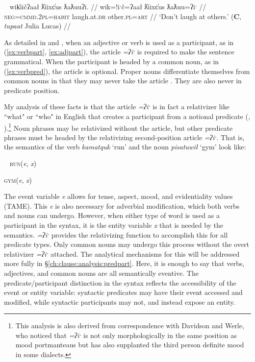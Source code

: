 \ex~ \label{ex:adjpart}
\begingl
\glpreamble wik̓iičʔaał ƛ̓iixc̓us ƛaƛuuʔi. //
\gla wik=!iˑč=ʔaał ƛ̓iixc̓us ƛaƛuu=ʔiˑ //
\glb \textsc{neg}=\textsc{cmmd.2pl}=\textsc{habit} laugh.at.\textsc{dr} other.\textsc{pl}=\textsc{art} //
\glft `Don't laugh at others.' (\textbf{C}, \textit{tupaat} Julia Lucas) //
\endgl
\xe


As detailed in \citet{jacobsen1979} and \citet{wojdak2001}, when an adjective or verb is used as a participant, as in (\ref{ex:verbpart}, \ref{ex:adjpart}), the article \textit{=ʔiˑ} is required to make the sentence grammatical. When the participant is headed by a common noun, as in (\ref{ex:verbpred}), the article is optional. Proper nouns differentiate themselves from common nouns in that they may never take the article \citep{inman2018}. They are also never in predicate position.

My analysis of these facts is that the article \textit{=ʔiˑ} is in fact a relativizer like ``what" or ``who" in English that creates a participant from a notional predicate (\citet[p.~136]{davidson2002}, \citet{inman2018}).\footnote{This analysis is also derived from correspondence with Davidson and Werle, who noticed that \textit{=ʔiˑ} is not only morphologically in the same position as mood portmanteaus but has also supplanted the third person definite mood in some dialects.} Noun phrases may be relativized without the article, but other predicate phrases must be headed by the relativizing second-position article \textit{=ʔiˑ}. That is, the semantics of the verb \textit{kamatquk} `run' and the noun \textit{pisatuwił} `gym' look like:

\ex~
\textsc{run}(\textit{e}, \textit{x})

\textsc{gym}(\textit{e}, \textit{x})
\xe

The event variable \textit{e} allows for tense, aspect, mood, and evidentiality values (TAME). This \textit{e} is also necessary for adverbial modification, which both verbs and nouns can undergo. However, when either type of word is used as a participant in the syntax, it is the entity variable \textit{x} that is needed by the semantics. \textit{=ʔiˑ} provides the relativizing function to accomplish this for all predicate types. Only common nouns may undergo this process without the overt relativizer \textit{=ʔiˑ} attached. The analytical mechanisms for this will be addressed more fully in \S\ref{ch:clause:analysis:predpart}. Here, it is enough to say that verbs, adjectives, and common nouns are all semantically eventive. The predicate/participant distinction in the syntax reflects the accessibility of the event or entity variable: syntactic predicates may have their event accessed and modified, while syntactic participants may not, and instead expose an entity.

